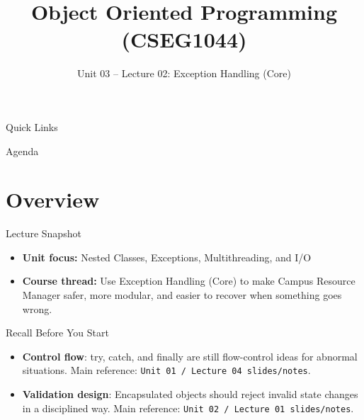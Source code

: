\documentclass{beamer}
\title[OOPS with Java]{Object Oriented Programming (CSEG1044)}
\subtitle{Unit 03 -- Lecture 02: Exception Handling (Core)}
\begin{document}
\begin{frame}[fragile]
  \titlepage
  \vspace{0.5em}
  \slidesources{\OOPSUnitIIISources}
\end{frame}

\begin{frame}{Quick Links}
  \centering
  \hyperlink{sec:overview}{}\hspace{0.6em}
  \hyperlink{sec:concepts}{}\hspace{0.6em}
  \hyperlink{sec:demo}{}\hspace{0.6em}
  \hyperlink{sec:summary}{}
  \slidesources{\OOPSUnitIIISources}
\end{frame}

\begin{frame}{Agenda}
  \tableofcontents
  \slidesources{\OOPSUnitIIISources}
\end{frame}

\section{Overview}
\label{sec:overview}

\begin{frame}{Lecture Snapshot}
\begin{itemize}[<+->]
  \item \textbf{Unit focus:} Nested Classes, Exceptions, Multithreading, and I/O
  \item \textbf{Course thread:} Use Exception Handling (Core) to make Campus Resource Manager safer, more modular, and easier to recover when something goes wrong.
\end{itemize}
  \slidesources{\OOPSUnitIIISources}
\end{frame}

\begin{frame}{Recall Before You Start}
\begin{itemize}[<+->]
  \item \textbf{Control flow}: try, catch, and finally are still flow-control ideas for abnormal situations. Main reference: \texttt{Unit 01 / Lecture 04 slides/notes}.
  \item \textbf{Validation design}: Encapsulated objects should reject invalid state changes in a disciplined way. Main reference: \texttt{Unit 02 / Lecture 01 slides/notes}.
\end{itemize}
  \slidesources{\OOPSUnitIIISources}
\end{frame}
\end{document}
